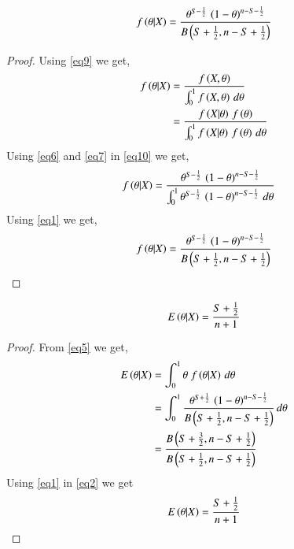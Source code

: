 \documentclass[journal,12pt,twocolumn]{IEEEtran}
\begin{document}
\begin{lemma}
\begin{align}
    f\left(\theta|X\right) = \frac{\theta^{S-\frac{1}{2}}\,\left(1-\theta\right)^{n-S-\frac{1}{2}}}{B\left(S+\frac{1}{2},n-S+\frac{1}{2}\right)}
\end{align}
\end{lemma}

\begin{proof}
Using \eqref{eq9} we get,
\begin{align}
    f\left(\theta|X\right) &= \frac{f\left(X,\theta\right)}{\int_0^1 f\left(X,\theta\right)\,d\theta} \nonumber\\
    &= \frac{f\left(X|\theta\right)\, f\left(\theta\right)}{\int_0^1 f\left(X|\theta\right)\, f\left(\theta\right)\,d\theta}\label{eq10}
\end{align}
Using \eqref{eq6} and \eqref{eq7} in \eqref{eq10} we get,
\begin{align}
    f\left(\theta|X\right) &= \frac{\theta^{S-\frac{1}{2}}\,\left(1-\theta\right)^{n-S-\frac{1}{2}}}{\int_0^1 \theta^{S-\frac{1}{2}}\,\left(1-\theta\right)^{n-S-\frac{1}{2}}\,d\theta}
\end{align}
Using \eqref{eq1} we get,
\begin{align}
    f\left(\theta|X\right) = \frac{\theta^{S-\frac{1}{2}}\,\left(1-\theta\right)^{n-S-\frac{1}{2}}}{B\left(S+\frac{1}{2},n-S+\frac{1}{2}\right)}
\end{align}
\end{proof}

\begin{corollary}
\begin{align}
    E\left(\theta|X\right) = \frac{S+\frac{1}{2}}{n+1}\label{eq3}
\end{align}
\end{corollary}

\begin{proof}
From \eqref{eq5} we get,
\begin{align}
    E\left(\theta|X\right) &= \int_0^1 \theta\;f\left(\theta|X\right)\,d\theta\nonumber\\
    &=\int_0^1 \frac{\theta^{S+\frac{1}{2}}\,\left(1-\theta\right)^{n-S-\frac{1}{2}}}{B\left(S+\frac{1}{2},n-S+\frac{1}{2}\right)}\,d\theta\nonumber\\
    &=\frac{B\left(S+\frac{3}{2},n-S+\frac{1}{2}\right)}{B\left(S+\frac{1}{2},n-S+\frac{1}{2}\right)}\label{eq2}
\end{align}
Using \eqref{eq1} in \eqref{eq2} we get
\begin{align}
    E\left(\theta|X\right) = \frac{S+\frac{1}{2}}{n+1}
\end{align}
\end{proof}
\end{document}
